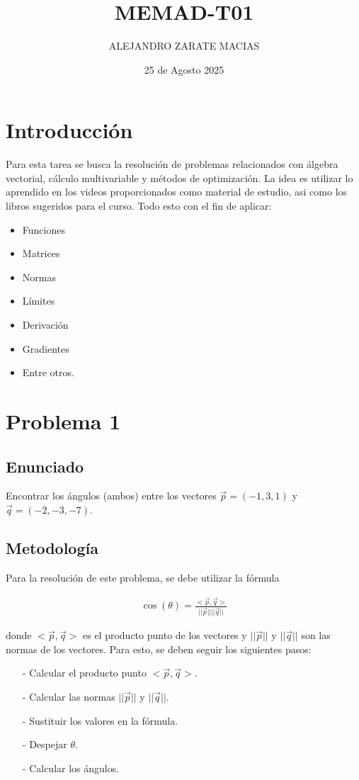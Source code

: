 \documentclass{article}
\title{MEMAD-T01}
\author{ALEJANDRO ZARATE MACIAS}
\date{25 de Agosto 2025}
\begin{document}
\maketitle

\section*{Introducción}

Para esta tarea se busca la resolución de problemas relacionados con álgebra vectorial, cálculo multivariable y métodos de optimización.
La idea es utilizar lo aprendido en los videos proporcionados como material de estudio, asi como los libros sugeridos para el curso. Todo esto con el fin de aplicar:
\begin{itemize}
    \item Funciones
    \item Matrices
    \item Normas
    \item Límites
    \item Derivación
    \item Gradientes
    \item Entre otros.
\end{itemize}

\section{Problema 1}

\subsection{Enunciado}
Encontrar los ángulos (ambos) entre los vectores $\vec{p} = (-1, 3, 1)$ y $\vec{q} = (-2, -3, -7)$.

\subsection{Metodología}
Para la resolución de este problema, se debe utilizar la fórmula

\begin{align}
\cos(\theta) = \frac{<\vec{p},\vec{q}>}{||\vec{p}|| ||\vec{q}||}
\end{align}

donde $<\vec{p},\vec{q}>$ es el producto punto de los vectores y $||\vec{p}||$ y $||\vec{q}||$ son las normas de los vectores.
Para esto, se deben seguir los siguientes pasos:
\begin{enumerate}
    \item[-]  Calcular el producto punto $<\vec{p},\vec{q}>$.
    \item[-] Calcular las normas $||\vec{p}||$ y $||\vec{q}||$.
    \item[-] Sustituir los valores en la fórmula.
    \item[-] Despejar $\theta$.
    \item[-] Calcular los ángulos.
\end{enumerate}
\end{document}
